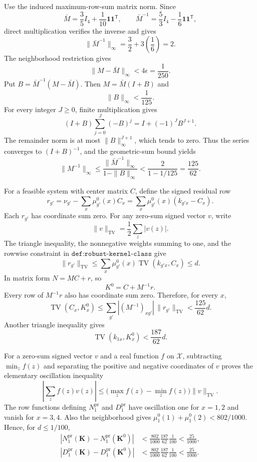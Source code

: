 Use the induced maximum-row-sum matrix norm. Since
\[
 \bar M=\frac35 I_4+\frac1{10}\mathbf 1\mathbf 1^{\mathsf T},
 \qquad
 \bar M^{-1}=\frac53I_4-\frac16\mathbf 1\mathbf 1^{\mathsf T},
\]
direct multiplication verifies the inverse and gives
\[
 \|\bar M^{-1}\|_\infty=\frac32+3\left(\frac16\right)=2.
\]
The neighborhood restriction gives
\[
 \|M-\bar M\|_\infty<4\epsilon=\frac1{250}.
\]
Put \(B=\bar M^{-1}(M-\bar M)\). Then \(M=\bar M(I+B)\) and
\[
 \|B\|_\infty<\frac1{125}.
\]
For every integer \(J\ge0\), finite multiplication gives
\[
 (I+B)\sum_{j=0}^{J}(-B)^j=I+(-1)^JB^{J+1}.
\]
The remainder norm is at most \(\|B\|_\infty^{J+1}\), which tends to zero. Thus the series converges to \((I+B)^{-1}\), and the geometric-sum bound yields
\[
 \|M^{-1}\|_\infty
 \le \frac{\|\bar M^{-1}\|_\infty}{1-\|B\|_\infty}
 <\frac{2}{1-1/125}=\frac{125}{62}.
\]

For a feasible system with center matrix \(C\), define the signed residual row
\[
 r_{g'}=\nu_{g'}-\sum_x\mu_{g'}^0(x)C_x
 =\sum_x\mu_{g'}^0(x)(k_{g'x}-C_x).
\]
Each \(r_{g'}\) has coordinate sum zero. For any zero-sum signed vector \(v\), write
\[
 \|v\|_{\mathrm{TV}}=\frac12\sum_z|v(z)|.
\]
The triangle inequality, the nonnegative weights summing to one, and the rowwise constraint in \(\texttt{def:robust-kernel-class}\) give
\[
 \|r_{g'}\|_{\mathrm{TV}}
 \le\sum_x\mu_{g'}^0(x)\operatorname{TV}(k_{g'x},C_x)
 \le d.
\]
In matrix form \(N=MC+r\), so
\[
 K^0=C+M^{-1}r.
\]
Every row of \(M^{-1}r\) also has coordinate sum zero. Therefore, for every \(x\),
\[
 \operatorname{TV}(C_x,K_x^0)
 \le\sum_{g'}|(M^{-1})_{xg'}|\,\|r_{g'}\|_{\mathrm{TV}}
 <\frac{125}{62}d.
\]
Another triangle inequality gives
\[
 \operatorname{TV}(k_{1x},K_x^0)<\frac{187}{62}d.
\]

For a zero-sum signed vector \(v\) and a real function \(f\) on \(\mathcal X\), subtracting \(\min_z f(z)\) and separating the positive and negative coordinates of \(v\) proves the elementary oscillation inequality
\[
 \left|\sum_zf(z)v(z)\right|
 \le\bigl(\max_zf(z)-\min_zf(z)\bigr)\|v\|_{\mathrm{TV}}.
\]
The row functions defining \(N_1^{\mathrm{pr}}\) and \(D_1^{\mathrm{pr}}\) have oscillation one for \(x=1,2\) and vanish for \(x=3,4\). Also the neighborhood gives \(\mu_1^0(1)+\mu_1^0(2)<802/1000\). Hence, for \(d\le1/100\),
\[
 \begin{split}
 |N_1^{\mathrm{pr}}(\mathbf K)-N_1^{\mathrm{pr}}(\mathbf K^0)|
 &<\frac{802}{1000}\frac{187}{62}\frac1{100}<\frac{25}{1000},\\
 |D_1^{\mathrm{pr}}(\mathbf K)-D_1^{\mathrm{pr}}(\mathbf K^0)|
 &<\frac{802}{1000}\frac{187}{62}\frac1{100}<\frac{25}{1000}.
 \end{split}
\]

